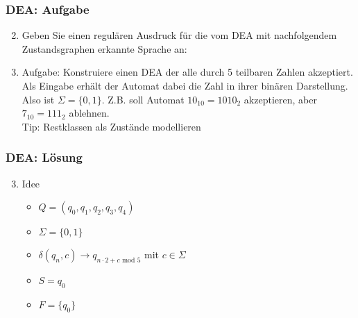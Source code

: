\documentclass{beamer}
\begin{document}
\begin{frame}
\frametitle{DEA: Aufgabe}
\begin{enumerate}
\setcounter{enumi}{1}
\item Geben Sie einen regulären Ausdruck für die vom DEA mit nachfolgendem Zustandsgraphen erkannte Sprache an:
\begin{center}
\end{center}
\end{enumerate}
\end{frame}
\begin{frame}
	\begin{enumerate}
	\setcounter{enumi}{2}
	\item Aufgabe: Konstruiere einen DEA der alle durch 5 teilbaren Zahlen akzeptiert. Als Eingabe erhält der Automat dabei die Zahl in ihrer binären Darstellung. Also ist $\Sigma = \{0, 1\}$. Z.B. soll Automat $10_{10} = 1010_{2}$ akzeptieren, aber $7_{10} = 111_{2}$ ablehnen.
	\pause \\[10pt]
	Tip: Restklassen als Zustände modellieren
	\end{enumerate}
\end{frame}
\begin{frame}
	\frametitle{DEA: Lösung}
	\begin{enumerate}
	\setcounter{enumi}{2}
	\item Idee
		\begin{itemize}
		\item $Q = (q_0, q_1, q_2, q_3, q_4)$\\
		\item $\Sigma = \{0,1\}$
		\item $\delta(q_n, c) \rightarrow q_{n \cdot 2 + c\mbox{ mod }5}$ mit $c\in\Sigma$\\
		\item $S = q_0$\\
		\item $F = \{q_0\}$
		\end{itemize}
	\end{enumerate}
\end{frame}
\end{document}
